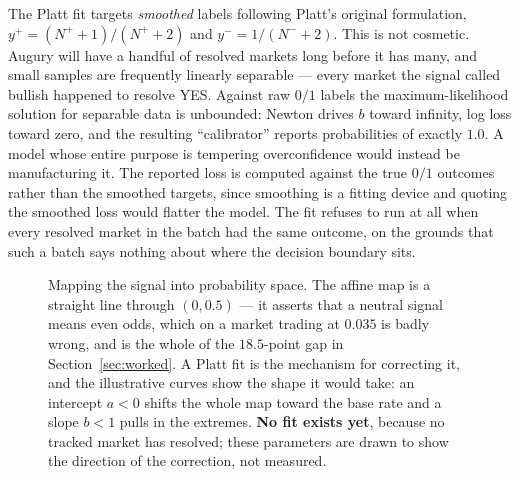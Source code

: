 \documentclass[11pt]{article}
\begin{document}
The Platt fit targets \emph{smoothed} labels following Platt's original
formulation, $y^{+} = (N^{+}+1)/(N^{+}+2)$ and $y^{-} = 1/(N^{-}+2)$. This is
not cosmetic. Augury will have a handful of resolved markets long before it has
many, and small samples are frequently linearly separable --- every market the
signal called bullish happened to resolve YES. Against raw $0/1$ labels the
maximum-likelihood solution for separable data is unbounded: Newton drives $b$
toward infinity, log loss toward zero, and the resulting ``calibrator'' reports
probabilities of exactly $1.0$. A model whose entire purpose is tempering
overconfidence would instead be manufacturing it. The reported loss is computed
against the true $0/1$ outcomes rather than the smoothed targets, since
smoothing is a fitting device and quoting the smoothed loss would flatter the
model. The fit refuses to run at all when every resolved market in the batch had
the same outcome, on the grounds that such a batch says nothing about where the
decision boundary sits.

\begin{figure}[htbp]
\centering
{}
\caption[Affine versus Platt signal-to-probability mappings]{Mapping the signal into probability space. The affine map is a straight
line through $(0, 0.5)$ --- it asserts that a neutral signal means even odds,
which on a market trading at $0.035$ is badly wrong, and is the whole of the
$18.5$-point gap in Section~\ref{sec:worked}. A Platt fit is the mechanism for
correcting it, and the illustrative curves show the shape it would take: an
intercept $a<0$ shifts the whole map toward the base rate and a slope $b<1$
pulls in the extremes. \textbf{No fit exists yet}, because no tracked market has
resolved; these parameters are drawn to show the direction of the correction,
not measured.}
\label{fig:calibmap}
\end{figure}
\end{document}
